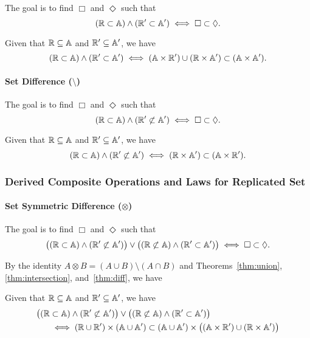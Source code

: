 
The goal is to find $\Box$ and $\Diamond$ such that
\[
  (\mathbb{R} \subset \mathbb{A}) \land (\mathbb{R}' \subset \mathbb{A}') \iff \Box \subset \Diamond.
\]

\begin{theorem}  \label{thm:intersection}
  Given that $\mathbb{R} \subseteq \mathbb{A}$ and $\mathbb{R}' \subseteq \mathbb{A}'$, we have
  \[
    (\mathbb{R} \subset \mathbb{A}) \land (\mathbb{R}' \subset \mathbb{A}') \iff (\mathbb{A} \times \mathbb{R}') \cup (\mathbb{R} \times \mathbb{A}') \subset (\mathbb{A} \times \mathbb{A}').
  \]
\end{theorem}
\paragraph{Set Difference ($\setminus$)}

The goal is to find $\Box$ and $\Diamond$ such that
\[
  (\mathbb{R} \subset \mathbb{A}) \land (\mathbb{R}' \not\subset \mathbb{A}') \iff \Box \subset \Diamond.
\]

\begin{theorem}  \label{thm:diff}
  Given that $\mathbb{R} \subseteq \mathbb{A}$ and $\mathbb{R}' \subseteq \mathbb{A}'$, we have 
  \[
    (\mathbb{R} \subset \mathbb{A}) \land (\mathbb{R}' \not\subset \mathbb{A}') \iff (\mathbb{R} \times \mathbb{A}') \subset (\mathbb{A} \times \mathbb{R}').
  \]
\end{theorem}
\subsubsection{Derived Composite Operations and Laws for Replicated Set}	\label{sss:rset-law}

\paragraph{Set Symmetric Difference ($\otimes$)}

The goal is to find $\Box$ and $\Diamond$ such that
\[
  \big((\mathbb{R} \subset \mathbb{A}) \land (\mathbb{R}' \not\subset \mathbb{A}')\big) \lor 
  \big((\mathbb{R} \not\subset \mathbb{A}) \land (\mathbb{R}' \subset \mathbb{A}')\big) \iff \Box \subset \Diamond.
\]

By the identity $A \otimes B = (A \cup B) \setminus (A \cap B)$ 
and Theorems~\ref{thm:union}, \ref{thm:intersection}, and~\ref{thm:diff}, we have
\begin{theorem}  \label{thm:sym-diff}
  Given that $\mathbb{R} \subseteq \mathbb{A}$ and $\mathbb{R}' \subseteq \mathbb{A}'$, we have
  \begin{align*}
    \big((\mathbb{R} &\subset \mathbb{A}) \land (\mathbb{R}' \not\subset \mathbb{A}')\big) \lor 
    \big((\mathbb{R} \not\subset \mathbb{A}) \land (\mathbb{R}' \subset \mathbb{A}')\big) \\
    & \iff (\mathbb{R} \cup \mathbb{R}') \times (\mathbb{A} \cup \mathbb{A}') \subset (\mathbb{A} \cup \mathbb{A}') \times \big((\mathbb{A} \times \mathbb{R}') \cup (\mathbb{R} \times \mathbb{A}')\big)
  \end{align*}
\end{theorem}

